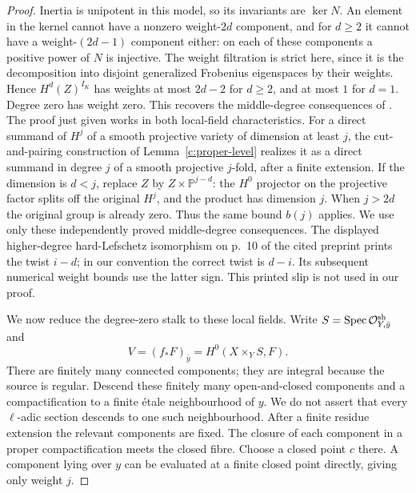 \begin{proof}
Inertia is unipotent in this model, so its invariants are $\ker N$.
An element in the kernel cannot have a nonzero weight-$2d$ component,
and for $d\geq2$ it cannot have a weight-$(2d-1)$ component either:
on each of these components a positive power of $N$ is injective.
The weight filtration is strict here, since it is the decomposition
into disjoint generalized Frobenius eigenspaces by their weights.
Hence $H^d(Z)^{I_K}$ has weights at most $2d-2$ for $d\geq2$, and
at most $1$ for $d=1$.  Degree zero has weight zero.  This recovers
the middle-degree consequences of
\citet[Theorem~1.6 and Proposition~1.8, pp.~9--11]{c_yamamura2026weights}.
The proof just given works in both local-field characteristics.
For a direct summand of $H^j$ of a smooth projective variety of
dimension at least $j$, the cut-and-pairing construction of
Lemma~\ref{c:proper-level} realizes it as a direct summand in degree
$j$ of a smooth projective $j$-fold, after a finite extension.
If the dimension is $d<j$, replace $Z$ by
$Z\times\mathbb P^{j-d}$: the $H^0$ projector on the projective
factor splits off the original $H^j$, and the product has dimension
$j$.  When $j>2d$ the original group is already zero.
Thus the same bound $b(j)$ applies.
We use only these independently proved middle-degree consequences.
The displayed higher-degree hard-Lefschetz isomorphism on p.~10
of the cited preprint prints the twist $i-d$; in our convention
the correct twist is $d-i$.  Its subsequent numerical weight bounds
use the latter sign.  This printed slip is not used in our proof.

We now reduce the degree-zero stalk to these local fields.
Write $S=\operatorname{Spec}\mathcal O_{Y,\bar y}^{\mathrm{sh}}$ and
\[
 V=(f_*F)_{\bar y}=H^0(X\times_Y S,F).
\]
There are finitely many connected components; they are integral
because the source is regular.  Descend these finitely many
open-and-closed components and a compactification to a finite
\'etale neighbourhood of $y$.  We do not assert that every
$\ell$-adic section descends to one such neighbourhood.
After a finite residue extension the relevant components are fixed.
The closure of each component in a proper compactification meets
the closed fibre.  Choose a closed point $c$ there.  A component
lying over $y$ can be evaluated at a finite closed point directly,
giving only weight $j$.


\end{proof}
